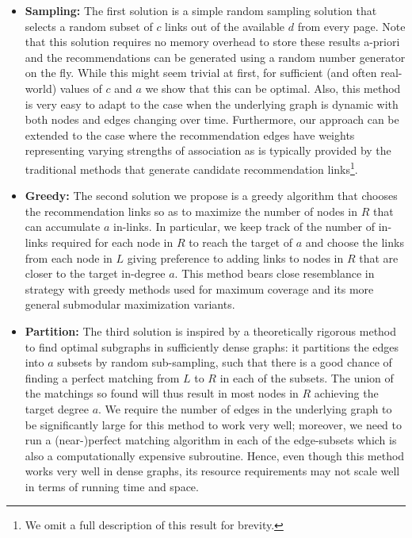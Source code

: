 \begin{itemize}

\item {\bf Sampling:} The first solution is a simple random sampling
  solution that selects a random subset of $c$ links out of the
  available $d$ from every page. Note that this solution requires no
  memory overhead to store these results a-priori and the
  recommendations can be generated using a random number generator on
  the fly. While this might seem trivial at first, for sufficient (and
  often real-world) values of $c$ and $a$ we show that this can be
  optimal. Also, this method is very easy to adapt to the case when the underlying graph is dynamic with both nodes and edges changing over time. Furthermore, our
  approach can be extended to the case where the recommendation edges
  have weights representing varying strengths of association as is typically provided by the traditional methods that generate candidate recommendation links\footnote{We omit a full description of this result for brevity.}.

\item {\bf Greedy:} The second solution we propose is a greedy
  algorithm that chooses the recommendation links so as to maximize
  the number of nodes in $R$ that can accumulate $a$ in-links. In
  particular, we keep track of the number of in-links required for
  each node in $R$ to reach the target of $a$ and choose the links
  from each node in $L$ giving preference to adding links to nodes in
  $R$ that are closer to the target in-degree $a$. This method bears close resemblance in strategy with greedy methods used for maximum coverage and its more general submodular maximization variants.

\item {\bf Partition:} The third solution is inspired by a
  theoretically rigorous method to find optimal subgraphs in
  sufficiently dense graphs: it partitions the edges into $a$ subsets
  by random sub-sampling, such that there is a good chance of finding
  a perfect matching from $L$ to $R$ in each of the subsets. The union
  of the matchings so found will thus result in most nodes in $R$
  achieving the target degree $a$. We require the number of edges in
  the underlying graph to be significantly large for this method to
  work very well; moreover, we need to run a (near-)perfect matching
  algorithm in each of the edge-subsets which is also a computationally
  expensive subroutine. Hence, even though this method works very well
  in dense graphs, its resource requirements may not scale well in terms of running
  time and space.
\end{itemize}


